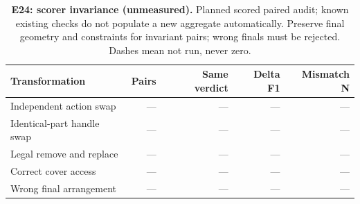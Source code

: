 \begin{table}[!ht]
\centering\small
\caption{\textbf{E24: scorer invariance (unmeasured).} Planned scored paired audit; known existing checks do not populate a new aggregate automatically. Preserve final geometry and constraints for invariant pairs; wrong finals must be rejected. Dashes mean not run, never zero.}
\begin{tabularx}{\textwidth}{@{}Xrrrr@{}}\toprule
Transformation & Pairs & Same verdict & Delta F1 & Mismatch N\\\midrule
Independent action swap & --- & --- & --- & ---\\
Identical-part handle swap & --- & --- & --- & ---\\
Legal remove and replace & --- & --- & --- & ---\\
Correct cover access & --- & --- & --- & ---\\
Wrong final arrangement & --- & --- & --- & ---\\
\bottomrule
\end{tabularx}
\end{table}
